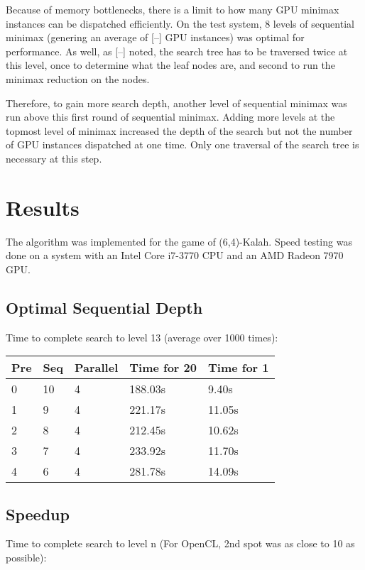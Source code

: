 \documentclass{article}
\begin{document}
Because of memory bottlenecks, there is a limit to how many GPU minimax instances can be dispatched efficiently. On the test system, 8 levels of sequential minimax (genering an average of [--] GPU instances) was optimal for performance. As well, as [--] noted, the search tree has to be traversed twice at this level, once to determine what the leaf nodes are, and second to run the minimax reduction on the nodes.

Therefore, to gain more search depth, another level of sequential minimax was run above this first round of sequential minimax. Adding more levels at the topmost level of minimax increased the depth of the search but not the number of GPU instances dispatched at one time. Only one traversal of the search tree is necessary at this step.

\section{Results}
The algorithm was implemented for the game of (6,4)-Kalah. Speed testing was done on a system with an Intel Core i7-3770 CPU and an AMD Radeon 7970 GPU.

\subsection{Optimal Sequential Depth}
Time to complete search to level 13 (average over 1000 times):

\begin{tabular}{| l | l | l | l | l |}
  \hline
  Pre & Seq & Parallel & Time for 20 & Time for 1 \\
  \hline
  0 & 10 & 4 & 188.03s & 9.40s \\
  1 & 9 & 4 & 221.17s & 11.05s \\ 
  2 & 8 & 4 & 212.45s & 10.62s \\
  3 & 7 & 4 & 233.92s & 11.70s \\ 
  4 & 6 & 4 & 281.78s & 14.09s \\
  \hline
\end{tabular}

\subsection{Speedup}

Time to complete search to level n (For OpenCL, 2nd spot was as close to 10 as possible):
\end{document}
